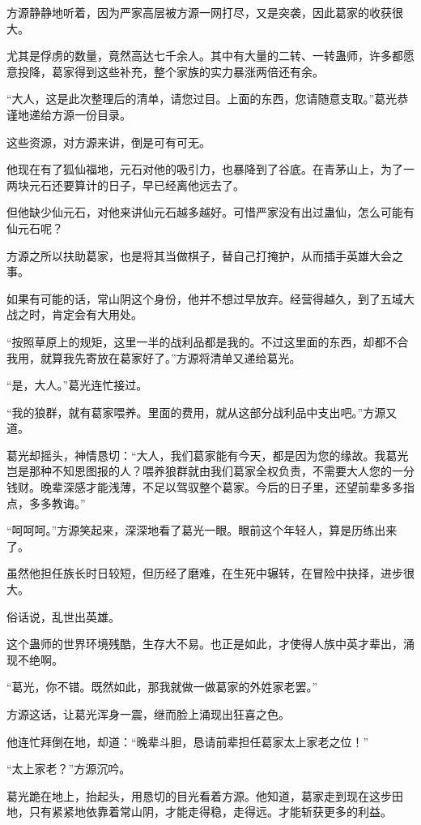 \begin{this_body}
方源静静地听着，因为严家高层被方源一网打尽，又是突袭，因此葛家的收获很大。

尤其是俘虏的数量，竟然高达七千余人。其中有大量的二转、一转蛊师，许多都愿意投降，葛家得到这些补充，整个家族的实力暴涨两倍还有余。

“大人，这是此次整理后的清单，请您过目。上面的东西，您请随意支取。”葛光恭谨地递给方源一份目录。

这些资源，对方源来讲，倒是可有可无。

他现在有了狐仙福地，元石对他的吸引力，也暴降到了谷底。在青茅山上，为了一两块元石还要算计的日子，早已经离他远去了。

但他缺少仙元石，对他来讲仙元石越多越好。可惜严家没有出过蛊仙，怎么可能有仙元石呢？

方源之所以扶助葛家，也是将其当做棋子，替自己打掩护，从而插手英雄大会之事。

如果有可能的话，常山阴这个身份，他并不想过早放弃。经营得越久，到了五域大战之时，肯定会有大用处。

“按照草原上的规矩，这里一半的战利品都是我的。不过这里面的东西，却都不合我用，就算我先寄放在葛家好了。”方源将清单又递给葛光。

“是，大人。”葛光连忙接过。

“我的狼群，就有葛家喂养。里面的费用，就从这部分战利品中支出吧。”方源又道。

葛光却摇头，神情恳切：“大人，我们葛家能有今天，都是因为您的缘故。我葛光岂是那种不知恩图报的人？喂养狼群就由我们葛家全权负责，不需要大人您的一分钱财。晚辈深感才能浅薄，不足以驾驭整个葛家。今后的日子里，还望前辈多多指点，多多教诲。”

“呵呵呵。”方源笑起来，深深地看了葛光一眼。眼前这个年轻人，算是历练出来了。

虽然他担任族长时日较短，但历经了磨难，在生死中辗转，在冒险中抉择，进步很大。

俗话说，乱世出英雄。

这个蛊师的世界环境残酷，生存大不易。也正是如此，才使得人族中英才辈出，涌现不绝啊。

“葛光，你不错。既然如此，那我就做一做葛家的外姓家老罢。”

方源这话，让葛光浑身一震，继而脸上涌现出狂喜之色。

他连忙拜倒在地，却道：“晚辈斗胆，恳请前辈担任葛家太上家老之位！”

“太上家老？”方源沉吟。

葛光跪在地上，抬起头，用恳切的目光看着方源。他知道，葛家走到现在这步田地，只有紧紧地依靠着常山阴，才能走得稳，走得远。才能斩获更多的利益。


\end{this_body}
